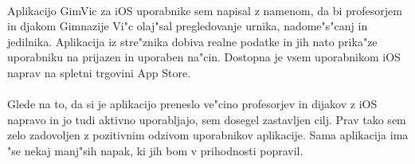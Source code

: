 \paragraph{}Aplikacijo GimVic za iOS uporabnike sem napisal z namenom, da bi profesorjem in djakom Gimnazije Vi"c olaj"sal pregledovanje urnika, nadome"s"canj in jedilnika. Aplikacija iz stre"znika dobiva realne podatke in jih nato prika"ze uporabniku na prijazen in uporaben na"cin. Dostopna je vsem uporabnikom iOS naprav na spletni trgovini App Store.

\paragraph{}Glede na to, da si je aplikacijo preneslo ve"cino profesorjev in dijakov z iOS napravo in jo tudi aktivno uporabljajo, sem dosegel zastavljen cilj. Prav tako sem zelo zadovoljen z pozitivnim odzivom uporabnikov aplikacije. Sama aplikacija ima "se nekaj manj"sih napak, ki jih bom v prihodnosti popravil.
